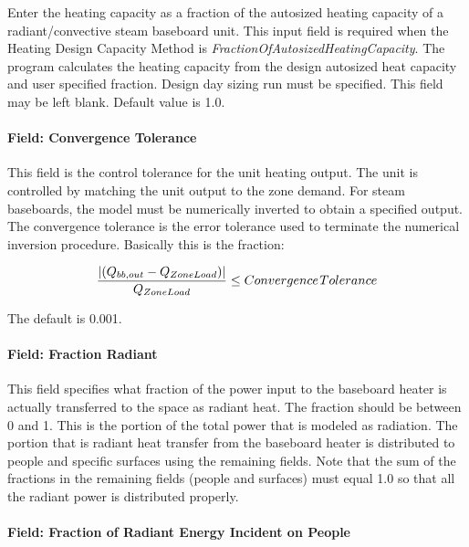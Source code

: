 Enter the heating capacity as a fraction of the autosized heating capacity of a radiant/convective steam baseboard unit. This input field is required when the Heating Design Capacity Method is \emph{FractionOfAutosizedHeatingCapacity}. The program calculates the heating capacity from the design autosized heat capacity and user specified fraction. Design day sizing run must be specified. This field may be left blank. Default value is 1.0.

\paragraph{Field: Convergence Tolerance}\label{field-convergence-tolerance-1-000}

This field is the control tolerance for the unit heating output. The unit is controlled by matching the unit output to the zone demand. For steam baseboards, the model must be numerically inverted to obtain a specified output. The convergence tolerance is the error tolerance used to terminate the numerical inversion procedure. Basically this is the fraction:

\begin{equation}
\frac{{\left| {({Q_{bb,out}} - {Q_{ZoneLoad}})} \right|}}{{{Q_{ZoneLoad}}}} \le Convergence{\kern 1pt} Tolerance
\end{equation}

The default is 0.001.

\paragraph{Field: Fraction Radiant}\label{field-fraction-radiant-1-000}

This field specifies what fraction of the power input to the baseboard heater is actually transferred to the space as radiant heat. The fraction should be between 0 and 1. This is the portion of the total power that is modeled as radiation. The portion that is radiant heat transfer from the baseboard heater is distributed to people and specific surfaces using the remaining fields. Note that the sum of the fractions in the remaining fields (people and surfaces) must equal 1.0 so that all the radiant power is distributed properly.

\paragraph{Field: Fraction of Radiant Energy Incident on People}\label{field-fraction-of-radiant-energy-incident-on-people-1}

